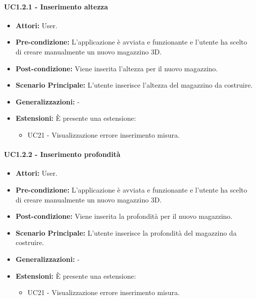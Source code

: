 \paragraph{UC1.2.1 - Inserimento altezza}
\begin{itemize}
    \item \textbf{Attori:} User.
    \item \textbf{Pre-condizione:}  L'applicazione è avviata e funzionante e l'utente ha scelto di creare manualmente un nuovo magazzino 3D.
    \item \textbf{Post-condizione:} Viene inserita l'altezza per il nuovo magazzino.
    \item \textbf{Scenario Principale:}  L’utente inserisce l'altezza del magazzino da costruire.
    \item \textbf{Generalizzazioni:} -
    \item \textbf{Estensioni:} È presente una estensione:
    \begin{itemize}
        \item UC21 - Visualizzazione errore inserimento misura.
    \end{itemize}
\end{itemize}


\paragraph{UC1.2.2 - Inserimento profondità}
\begin{itemize}
    \item \textbf{Attori:} User.
    \item \textbf{Pre-condizione:}  L'applicazione è avviata e funzionante e l'utente ha scelto di creare manualmente un nuovo magazzino 3D.
    \item \textbf{Post-condizione:} Viene inserita la profondità per il nuovo magazzino.
    \item \textbf{Scenario Principale:}  L’utente inserisce la profondità del magazzino da costruire.
    \item \textbf{Generalizzazioni:} -
    \item \textbf{Estensioni:} È presente una estensione:
    \begin{itemize}
        \item UC21 - Visualizzazione errore inserimento misura.
    \end{itemize}
\end{itemize}



